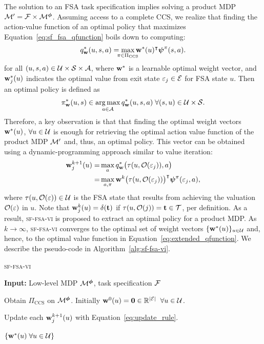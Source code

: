 The solution to an FSA task specification implies solving a product MDP $\mathcal{M}'=\mathcal{F}\times\mathcal{M}^{\boldsymbol{\phi}}$. Assuming access to a complete CCS, we realize that finding the action-value function of an optimal policy that maximizes Equation~\ref{eq:sf_fsa_qfunction} boils down to computing:
\begin{equation}
    q^*_\w(u,s,a) = \smashoperator{\max_{\pi\in\Pi_\text{CCS}}} \w^*(u)^{\intercal}\boldsymbol{\psi}^\pi(s,a).
    \label{eq:extended_qfunction}
\end{equation}
for all $(u,s,a)\in\mathcal{U}\times\mathcal{S}\times\mathcal{A}$, where $\mathbf{w}^*$ is a learnable optimal weight vector, and $\mathbf{w}_j^*(u)$ indicates the optimal value from exit state $\varepsilon_j\in\mathcal{E}$ for FSA state $u$. Then an optimal policy is defined as
\begin{equation}
    \pi^*_{\mathbf{w}}(u, s) \in \operatorname*{arg\,max}_{a\in\mathcal{A}} q^*_{\mathbf{w}}(u,s,a)\;\forall(s,u)\in\mathcal{U}\times\mathcal{S}.
    \label{eq:hl-policy}    
\end{equation}
Therefore, a key observation is that that finding the optimal weight vectors $\mathbf{w}^*(u)$, ${\forall u\in\mathcal{U}}$ is enough for retrieving the optimal action value function of the product MDP $\mathcal{M}'$ and, thus, an optimal policy.
This vector can be obtained using a dynamic-programming approach similar to value iteration: 
\begin{align}
\mathbf{w}_j^{k+1}(u) =&  \max_a q^*_{\mathbf{w}}\bigl(\tau(u,\mathcal{O}(\varepsilon_j)),a\bigr) \\
              =& 
    \max_{a,\pi} \mathbf{w}^k\bigl(\tau(u,\mathcal{O}(\varepsilon_j))\bigr)^{\intercal} \boldsymbol{\psi}^\pi (\varepsilon_j,a),  
    \label{eq:update_rule}
\end{align}
where $\tau(u,\mathcal{O}(\varepsilon))\in\mathcal{U}$ is the FSA state that results from achieving the valuation $\mathcal{O}(\varepsilon)$ in $u$. Note that $\mathbf{w}^k_j(u)=\delta(\textbf{t})$ if $\tau(u,\mathcal{O}(j))=\textbf{t}\in\mathcal{T}$, per definition. 
As a result, \textsc{sf-fsa-vi} is proposed to extract an optimal policy for a product MDP. As $k\rightarrow\infty$, \textsc{sf-fsa-vi} converges to the optimal set of weight vectors $\{\mathbf{w}^*(u)\}_{u\in\mathcal{U}}$ and, hence, to the optimal value function in Equation~\eqref{eq:extended_qfunction}. We describe the pseudo-code in Algorithm~\ref{alg:sf-fsa-vi}.

\begin{algorithm}[!htb]
  \caption{\textsc{sf-fsa-vi}}
  \textbf{Input:} Low-level MDP $\mathcal{M}^{\boldsymbol{\phi}}$, task specification $\mathcal{F}$
  \begin{algorithmic}[1]
    \State Obtain $\Pi_\text{CCS}$ on $\mathcal{M}^{\boldsymbol{\phi}}$.
    \State Initially  $\mathbf{w}^0(u) = \mathbf{0} \in\mathbb{R}^{\lvert\mathcal{E}\rvert}\;\;\forall u\in\mathcal{U}$.
   
        
        \State Update each $\mathbf{w}^{k+1}_j{(u)}$ with Equation~\eqref{eq:update_rule}.
       
      \EndFor
    \EndWhile
    
    \State \Return $\{\mathbf{w}^*(u)\;\forall u\in\mathcal{U}\}$
  \end{algorithmic}
  \label{alg:sf-fsa-vi}
\end{algorithm}


